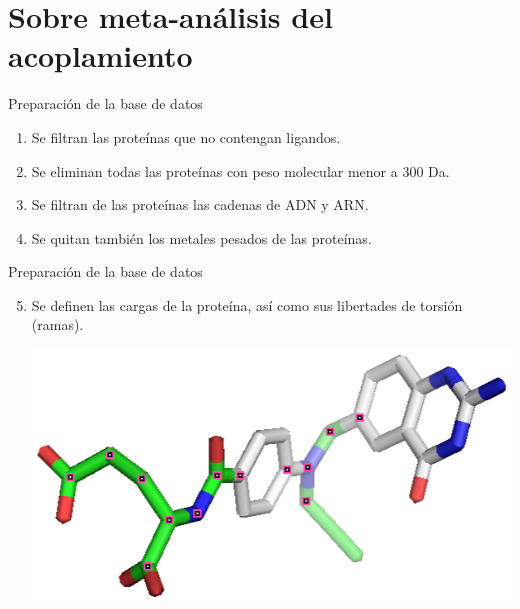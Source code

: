 \documentclass[presentation]{beamer}
\begin{document}
\section{Sobre meta-análisis del acoplamiento}
\label{sec:orgf5e6a0c}
\begin{frame}[label={sec:org9bd933f}]{Preparación de la base de datos}
\pause
\begin{enumerate}
\item Se filtran las proteínas que no contengan ligandos.
\pause
\item Se eliminan todas las proteínas con peso molecular menor a 300 Da.
\pause
\item Se filtran de las proteínas las cadenas de ADN y ARN.
\pause
\item Se quitan también los metales pesados de las proteínas.
\end{enumerate}
\end{frame}
\begin{frame}[label={sec:orga2cd831}]{Preparación de la base de datos}
\begin{enumerate}
\setcounter{enumi}{4}
\item Se definen las cargas de la proteína, así como sus libertades de torsión (\alert{ramas}).
\pause
\begin{center}
\includegraphics[width=.9\linewidth]{images/torsions.png}
\end{center}
\end{enumerate}
\end{frame}
\end{document}
